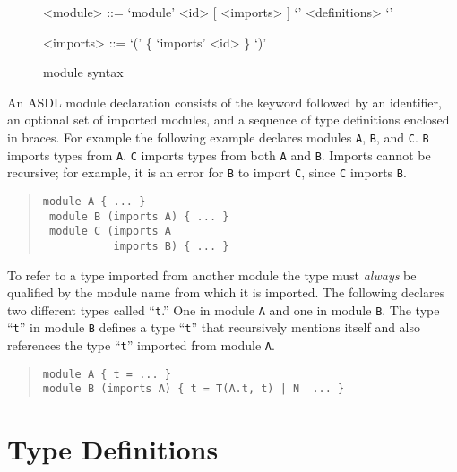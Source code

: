 \begin{figure}[ht]
  \begin{center}
    \begin{grammar}
      <module>  ::=  `module' <id> [ <imports> ] `{' <definitions> `}'

      <imports> ::=  `(' \{ `imports' <id> \} `)'
    \end{grammar}
  \end{center}
  \caption{\asdl{} module syntax}
\end{figure}%

An ASDL module declaration consists of the keyword 
followed by an identifier, an optional set of imported modules, and a
sequence of type definitions enclosed in braces. For example the
following example declares modules \lstinline[language=ASDL]!A!,
\lstinline[language=ASDL]!B!, and \lstinline[language=ASDL]!C!.
\lstinline[language=ASDL]!B! imports types from \lstinline[language=ASDL]!A!.
\lstinline[language=ASDL]!C! imports types from both \lstinline[language=ASDL]!A! and
\lstinline[language=ASDL]!B!.
Imports cannot be recursive; for example, it is an error for \lstinline[language=ASDL]!B! to
import \lstinline[language=ASDL]!C!, since \lstinline[language=ASDL]!C!
imports \lstinline[language=ASDL]!B!.
\begin{quote}\begin{lstlisting}[language=ASDL]
 module A { ... } 
 module B (imports A) { ... }
 module C (imports A 
           imports B) { ... }
\end{lstlisting}\end{quote}%

To refer to a type imported from another module the type must
\emph{always} be qualified by the module name from which it is
imported.
The following declares two different types called ``\texttt{t}.''
One in module \texttt{A} and one in module \texttt{B}.
The type ``\texttt{t}'' in module \texttt{B} defines a type ``\texttt{t}'' that
recursively mentions itself and also references the type ``\texttt{t}'' imported
from module \texttt{A}.
\begin{quote}\begin{lstlisting}[language=ASDL]
module A { t = ... } 
module B (imports A) { t = T(A.t, t) | N  ... }
\end{lstlisting}\end{quote}%

\section{Type Definitions}

